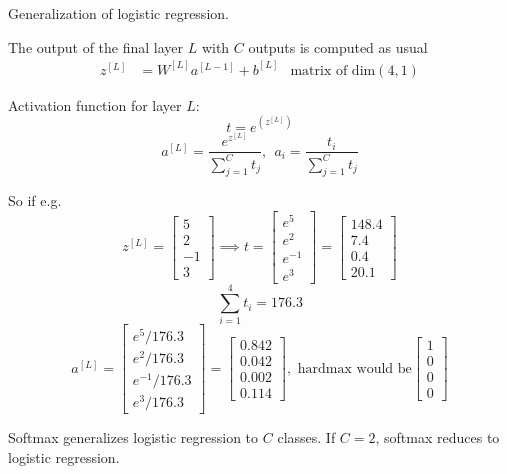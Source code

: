 Generalization of logistic regression.

The output of the final layer $L$ with $C$ outputs is computed as usual
\begin{align*}
    z^{[L]} & = W^{[L]} a^{[L-1]} + b^{[L]}   & \text{matrix of dim}(4,1)
\end{align*}

Activation function for layer $L$:
\[ t = e^{(z^{[L]})} \]
\[ a^{[L]} = \frac{e^{z^{[L]}}}{\sum_{j=1}^C t_j},\ \ a_i = \frac{t_i}{ \sum_{j=1}^C t_j} \]

So if e.g.
\[
    z^{[L]} = 
    \begin{bmatrix}
        5 \\
        2 \\
        -1 \\
        3
    \end{bmatrix}
    \implies
    t =
    \begin{bmatrix}
        e^5 \\
        e^2 \\
        e^{-1} \\
        e^3
    \end{bmatrix}
    =
    \begin{bmatrix}
        148.4 \\
        7.4 \\
        0.4 \\
        20.1
    \end{bmatrix}
\]
\[ \sum_{i=1}^4 t_i = 176.3 \]
 \[
    a^{[L]} = 
    \begin{bmatrix}
        e^5/176.3 \\
        e^2/176.3 \\
        e^{-1}/176.3 \\
        e^3/176.3
    \end{bmatrix}
    =
    \begin{bmatrix}
        0.842 \\
        0.042 \\
        0.002 \\
        0.114
    \end{bmatrix}
    , \text{  hardmax would be}
    \begin{bmatrix}
        1 \\
        0 \\
        0 \\
        0
    \end{bmatrix}
\]

Softmax generalizes logistic regression to $C$ classes. If $C=2$, softmax reduces to logistic regression.

